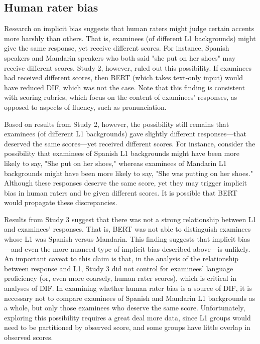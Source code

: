 \documentclass [PhD] {uclathes}
\begin{document}
\subsection{Human rater bias}

Research on implicit bias suggests that human raters might judge certain accents more harshly than others. That is, examinees (of different L1 backgrounds) might give the same response, yet receive different scores. For instance, Spanish speakers and Mandarin speakers who both said "she put on her shoes" may receive different scores. Study 2, however, ruled out this possibility. If examinees had received different scores, then BERT (which takes text-only input) would have reduced DIF, which was not the case. Note that this finding is consistent with scoring rubrics, which focus on the content of examinees’ responses, as opposed to aspects of fluency, such as pronunciation.

Based on results from Study 2, however, the possibility still remains that examinees (of different L1 backgrounds) gave slightly different responses—that deserved the same scores—yet received different scores. For instance, consider the possibility that examinees of Spanish L1 backgrounds might have been more likely to say, "She put on her shoes," whereas examinees of Mandarin L1 backgrounds might have been more likely to say, "She was putting on her shoes." Although these responses deserve the same score, yet they may trigger implicit bias in human raters and be given different scores. It is possible that BERT would propagate these discrepancies. 

Results from Study 3 suggest that there was not a strong relationship between L1 and examinees’ responses. That is, BERT was not able to distinguish examinees whose L1 was Spanish versus Mandarin. This finding suggests that implicit bias—and even the more nuanced type of implicit bias described above—is unlikely. An important caveat to this claim is that, in the analysis of the relationship between response and L1, Study 3 did not control for examinees’ language proficiency (or, even more coarsely, human rater scores), which is critical in analyses of DIF. In examining whether human rater bias is a source of DIF, it is necessary not to compare examinees of Spanish and Mandarin L1 backgrounds as a whole, but only those examinees who deserve the same score. Unfortunately, exploring this possibility requires a great deal more data, since L1 groups would need to be partitioned by observed score, and some groups have little overlap in observed scores. 
\end{document}

